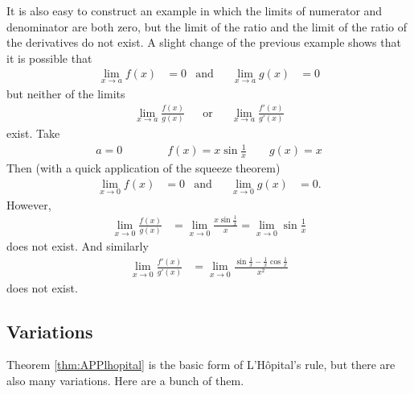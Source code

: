 It is also easy to construct an example in which the limits of numerator and denominator
are both zero, but the limit of the ratio and the limit of the ratio of the derivatives
do not exist. A slight change of the previous example shows that it is possible that
\begin{align*}
\lim\limits_{x\rightarrow a}f(x) &=0
& \text{and}&&
\lim\limits_{x\rightarrow a}g(x) &= 0
\end{align*}
but neither of the limits
\begin{align*}
\lim\limits_{x\rightarrow a}\frac{f(x)}{g(x)} && \text{or}&&
\lim\limits_{x\rightarrow a}\frac{f'(x)}{g'(x)}
\end{align*}
exist. Take
\begin{align*}
a=0\qquad   \qquad f(x)=x\sin\frac{1}{x} \qquad g(x)= x
\end{align*}
Then (with a quick application of the squeeze theorem)
\begin{align*}
  \lim_{x\to 0} f(x) &= 0 & \text{and}&&
  \lim_{x\to 0} g(x) &= 0.
\end{align*}
However,
\begin{align*}
\lim_{x\rightarrow 0}\frac{f(x)}{g(x)}
&=\lim_{x\rightarrow 0}\frac{x\sin\frac{1}{x} }{x}
=\lim_{x\rightarrow 0} \sin\frac{1}{x}
\end{align*}
does not exist. And similarly
\begin{align*}
  \lim_{x\rightarrow 0}\frac{f'(x)}{g'(x)}
  &= \lim_{x\to 0} \frac{\sin\frac{1}{x} - \frac{1}{x}\cos\frac{1}{x} }{x^2}
\end{align*}
does not exist.


\subsection{Variations}
Theorem \ref{thm:APPlhopital} is the basic form of L'H\^opital's
rule, but there are also many variations. Here are a bunch of them.

